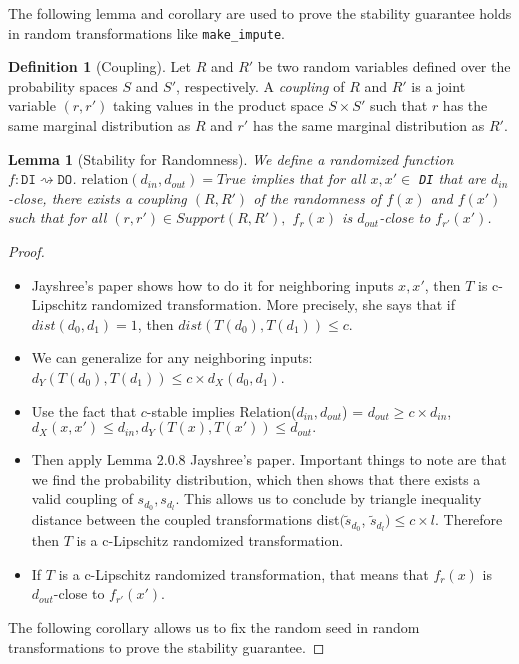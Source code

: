 \documentclass[11pt,a4paper]{article}
\newtheorem{lemma}[theorem]{Lemma}
\theoremstyle{definition}
\newtheorem{definition}[theorem]{Definition}
\newcommand{\din}{d_{in}}
\newcommand{\dout}{d_{out}}
\newcommand{\Relation}{\mathrm{relation}}
\newcommand{\grace}[1]{{ {\color{purple}{(grace)~#1}}}}
\begin{document}
The following lemma and corollary are used to prove the stability guarantee holds in random transformations like \texttt{make\_impute}. 

\begin{definition}[Coupling]
Let $R$ and $R'$ be two random variables defined over the probability spaces $S$ and $S'$, respectively. A \emph{coupling} of $R$ and $R'$ is a joint variable $(r, r')$ taking values in the product space $S \times S'$ such that $r$ has the same marginal distribution as $R$ and $r'$ has the same marginal distribution as $R'.$
\end{definition}
\grace{Taken from Jayshree's paper on Theil-Sen estimator.}

\begin{lemma}[Stability for Randomness]
We define a randomized function $f: \texttt{DI} \rightsquigarrow \texttt{DO}$. $\Relation(d_{in}, d_{out}) = True$ implies that for all $x, x' \in$ \texttt{DI} that are $d_{in}$-close, there exists a coupling $(R, R')$ of the randomness of $f(x)$ and $f(x')$ such that for all $(r, r') \in Support(R, R'),$ $f_r(x)$ is $d_{out}$-close to $f_{r'}(x')$.
\end{lemma}

\begin{proof}
\grace{Proof outline:}
\begin{itemize}
    \item Jayshree's paper shows how to do it for neighboring inputs $x, x'$, then $T$ is c-Lipschitz randomized transformation. More precisely, she says that if $dist(d_0, d_1) = 1$, then $dist(T(d_0), T(d_1)) \leq c$.
    \item We can generalize for any neighboring inputs: $d_Y(T(d_0), T(d_1)) \leq c \times d_X(d_0, d_1)$. 
    \item Use the fact that $c$-stable implies Relation($\din, \dout$) = $\dout \geq c \times \din$, $d_X(x, x') \leq \din, d_Y(T(x), T(x')) \leq \dout.$
    \item Then apply Lemma 2.0.8 Jayshree's paper. Important things to note are that we find the probability distribution, which then shows that there exists a valid coupling of $s_{d_0}, s_{d_l}$. This allows us to conclude by triangle inequality distance between the coupled transformations dist$(\tilde{s}_{d_0}$, $\tilde{s}_{d_l}) \leq c \times l$. Therefore then $T$ is a c-Lipschitz randomized transformation.
    \item If $T$ is a c-Lipschitz randomized transformation, that means that $f_r(x)$ is $\dout$-close to $f_{r'}(x')$. \grace{Need to flesh out these details.}
\end{itemize}

The following corollary allows us to fix the random seed in random transformations to prove the stability guarantee.
\end{proof}
\end{document}
